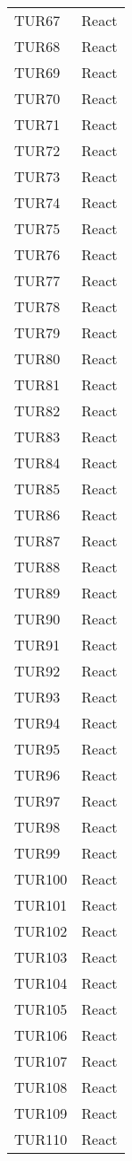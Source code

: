 \documentclass[PianoDiQualifica.tex]{subfiles}
\begin{document}
\begin{longtable}[H]{P{5cm}P{9cm}}
	TUR67 & React \\ 
	TUR68 & React \\ 
	TUR69 & React \\ 
	TUR70 & React \\ 
	TUR71 & React \\ 
	TUR72 & React \\ 
	TUR73 & React \\ 
	TUR74 & React \\ 
	TUR75 & React \\ 
	TUR76 & React \\ 
	TUR77 & React \\ 
	TUR78 & React \\ 
	TUR79 & React \\ 
	TUR80 & React \\ 
	TUR81 & React \\ 
	TUR82 & React \\ 
	TUR83 & React \\ 
	TUR84 & React \\ 
	TUR85 & React \\ 
	TUR86 & React \\ 
	TUR87 & React \\ 
	TUR88 & React \\ 
	TUR89 & React \\ 
	TUR90 & React \\ 
	TUR91 & React \\ 
	TUR92 & React \\ 
	TUR93 & React \\ 
	TUR94 & React \\ 
	TUR95 & React \\ 
	TUR96 & React \\ 
	TUR97 & React \\ 
	TUR98 & React \\ 
	TUR99 & React \\ 
	TUR100 & React \\ 
	TUR101 & React \\ 
	TUR102 & React \\ 
	TUR103 & React \\ 
	TUR104 & React \\ 
	TUR105 & React \\ 
	TUR106 & React \\ 
	TUR107 & React \\ 
	TUR108 & React \\ 
	TUR109 & React \\ 
	TUR110 & React \\ 

\end{longtable}
\end{document}
